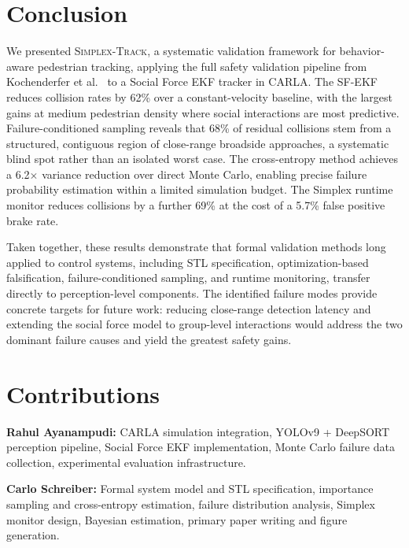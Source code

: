\documentclass[conference]{IEEEtran}
\begin{document}
\section{Conclusion}
\label{sec:conclusion}

We presented \textsc{Simplex-Track}, a systematic validation framework for behavior-aware pedestrian tracking, applying the full safety validation pipeline from Kochenderfer et al.~\cite{kochenderfer2025validation} to a Social Force EKF tracker in CARLA. The SF-EKF reduces collision rates by 62\% over a constant-velocity baseline, with the largest gains at medium pedestrian density where social interactions are most predictive. Failure-conditioned sampling reveals that 68\% of residual collisions stem from a structured, contiguous region of close-range broadside approaches, a systematic blind spot rather than an isolated worst case. The cross-entropy method achieves a 6.2$\times$ variance reduction over direct Monte Carlo, enabling precise failure probability estimation within a limited simulation budget. The Simplex runtime monitor reduces collisions by a further 69\% at the cost of a 5.7\% false positive brake rate.

Taken together, these results demonstrate that formal validation methods long applied to control systems, including STL specification, optimization-based falsification, failure-conditioned sampling, and runtime monitoring, transfer directly to perception-level components. The identified failure modes provide concrete targets for future work: reducing close-range detection latency and extending the social force model to group-level interactions would address the two dominant failure causes and yield the greatest safety gains.


\section*{Contributions}

\textbf{Rahul Ayanampudi:} CARLA simulation integration, YOLOv9 + DeepSORT perception pipeline, Social Force EKF implementation, Monte Carlo failure data collection, experimental evaluation infrastructure.

\textbf{Carlo Schreiber:} Formal system model and STL specification, importance sampling and cross-entropy estimation, failure distribution analysis, Simplex monitor design, Bayesian estimation, primary paper writing and figure generation.

\printbibliography
\end{document}
